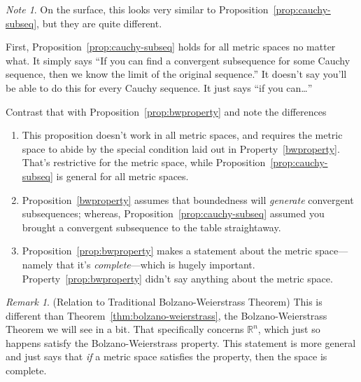 \documentclass[12pt]{article}
\theoremstyle{plain}
\theoremstyle{definition}
\theoremstyle{remark}
\newtheorem*{rmk}{Remark}
\newtheorem*{note}{Note}
\newcommand{\R}{\mathbb{R}}
\begin{document}
\begin{note}
On the surface, this looks very similar to
Proposition~\ref{prop:cauchy-subseq}, but they are quite different.

First, Proposition~\ref{prop:cauchy-subseq} holds for all metric spaces
no matter what. It simply says ``If you can find a convergent
subsequence for some Cauchy sequence, then we know the limit of the
original sequence.'' It doesn't say you'll be able to do this for every
Cauchy sequence. It just says ``if you can\ldots''

Contrast that with Proposition~\ref{prop:bwproperty} and note the
differences
\begin{enumerate}
  \item This proposition doesn't work in all metric spaces, and requires
    the metric space to abide by the special condition laid out in
    Property~\ref{bwproperty}. That's restrictive for the metric space,
    while Proposition~\ref{prop:cauchy-subseq} is general for all metric
    spaces.
  \item Proposition~\ref{bwproperty} assumes that boundedness
    will \emph{generate} convergent subsequences; whereas,
    Proposition~\ref{prop:cauchy-subseq} assumed you brought a
    convergent subsequence to the table straightaway.
  \item Proposition~\ref{prop:bwproperty} makes a statement about the
    metric space---namely that it's \emph{complete}---which is hugely
    important. Property~\ref{prop:bwproperty} didn't say anything about
    the metric space.
\end{enumerate}
\end{note}

\begin{rmk}
(Relation to Traditional Bolzano-Weierstrass Theorem) This is different
than Theorem~\ref{thm:bolzano-weierstrass}, the Bolzano-Weierstrass
Theorem we will see in a bit. That specifically concerns $\R^n$,
which just so happens satisfy the Bolzano-Weierstrass property. This
statement is more general and just says that \emph{if} a metric space
satisfies the property, then the space is complete.
\end{rmk}
\end{document}
